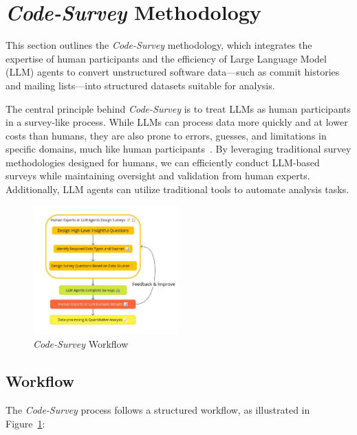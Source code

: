 \section{\emph{Code-Survey} Methodology}
\label{sec:methodology}

This section outlines the \emph{Code-Survey} methodology, which integrates the expertise of human participants and the efficiency of Large Language Model (LLM) agents to convert unstructured software data—such as commit histories and mailing lists—into structured datasets suitable for analysis.

The central principle behind \emph{Code-Survey} is to treat LLMs as human participants in a survey-like process. While LLMs can process data more quickly and at lower costs than humans, they are also prone to errors, guesses, and limitations in specific domains, much like human participants~\cite{ji2023survey}. By leveraging traditional survey methodologies designed for humans, we can efficiently conduct LLM-based surveys while maintaining oversight and validation from human experts. Additionally, LLM agents can utilize traditional tools to automate analysis tasks.

\begin{figure}[t]
    \centering
    \includegraphics[width=0.5\textwidth]{workflow.pdf}
    \caption{\emph{Code-Survey} Workflow}
    \label{fig:workflow}
\end{figure}

\subsection{Workflow}

The \emph{Code-Survey} process follows a structured workflow, as illustrated in Figure~\ref{fig:workflow}:


